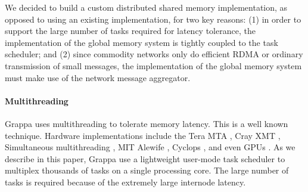 We decided to build a custom distributed shared memory implementation, as
opposed to using an existing implementation, for two key reasons: (1) in order
to support the large number of tasks required for latency tolerance, the
implementation of the global memory system is tightly coupled to the task
scheduler; and (2) since commodity networks only do efficient RDMA or ordinary
transmission of small messages, the implementation of the global memory system
must make use of the network message aggregator.

% 

\paragraph{Multithreading}
Grappa uses multithreading to tolerate memory latency. This is a well known
technique. Hardware implementations include the Tera MTA \cite{Tera}, Cray XMT
\cite{XMT}, Simultaneous multithreading \cite{SMT}, MIT Alewife
\cite{Alewife}, Cyclops \cite{Cyclops}, and even GPUs \cite{fatahalian}. As we
describe in this paper, Grappa use a lightweight user-mode task scheduler to
multiplex thousands of tasks on a single processing core. The large number of
tasks is required because of the extremely large internode latency.
